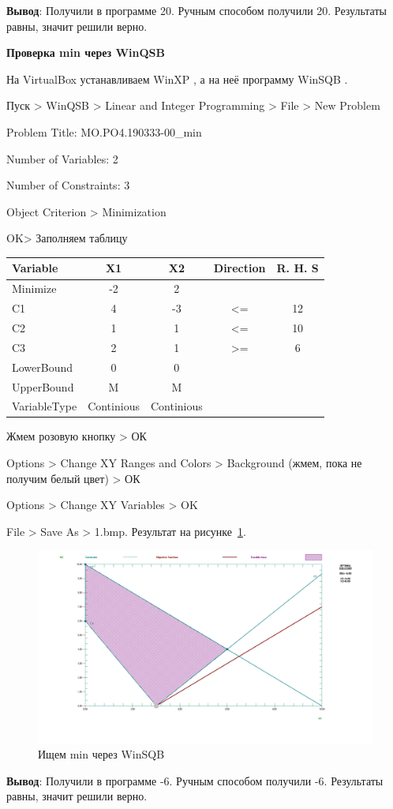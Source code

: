 \textbf{Вывод}: Получили в программе 20. Ручным способом получили 20. Результаты равны, значит решили верно.

\newpage

\begin{center}
\textbf{Проверка min через WinQSB}
\end{center}

На VirtualBox \cite{VirtualBox} устанавливаем WinXP \cite{WinXP}, а на неё программу WinSQB \cite{WinSQB}.

Пуск > WinQSB > Linear and Integer Programming > File > New Problem

Problem Title: MO.PO4.190333-00\_min

Number of Variables: 2

Number of Constraints: 3

Object Criterion > Minimization

OK> Заполняем таблицу

\begin{table}[h!]
  \centering
  \begin{tabular}{ |l||c|c|c|c| } 
    \hline
    Variable & X1 & X2 & Direction & R. H. S \\ \hline
    \hline
    Minimize & -2 & 2 &  & \\ \hline
    C1 & 4 & -3 & <= & 12 \\ \hline
    C2 & 1 & 1 & <= & 10 \\ \hline
    C3 & 2 & 1 & >= & 6 \\ \hline
    LowerBound & 0 & 0 &  & \\ \hline
    UpperBound & M & M &  & \\ \hline
    VariableType & Continious & Continious &  & \\ \hline
  \end{tabular}
\end{table}

Жмем розовую кнопку > ОК

Options > Change XY Ranges and Colors > Background (жмем, пока не получим белый цвет) > ОК

Options > Change XY Variables > OK

File > Save As > 1.bmp. Результат на рисунке~\ref{fig:min}.

\begin{figure}[!htb]
  \centering

  \includegraphics[width=16cm]
  {inc/min.png}

  \caption{Ищем min через WinSQB}
  \label{fig:min}
\end{figure}

\textbf{Вывод}: Получили в программе -6. Ручным способом получили -6. Результаты равны, значит решили верно.
